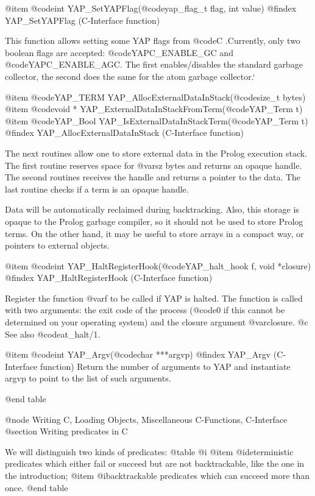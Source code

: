 {{{{{{{{@item  @code{int} YAP_SetYAPFlag(@code{yap_flag_t flag, int value})
@findex YAP_SetYAPFlag (C-Interface function)

This function allows setting some YAP flags from @code{C} .Currently,
only two boolean flags are accepted: @code{YAPC_ENABLE_GC} and
@code{YAPC_ENABLE_AGC}.  The first enables/disables the standard garbage
collector, the second does the same for the atom garbage collector.`

@item  @code{YAP_TERM} YAP_AllocExternalDataInStack(@code{size_t bytes})
@item  @code{void *} YAP_ExternalDataInStackFromTerm(@code{YAP_Term t})
@item  @code{YAP_Bool} YAP_IsExternalDataInStackTerm(@code{YAP_Term t})
@findex YAP_AllocExternalDataInStack (C-Interface function)

The next routines allow one to store external data in the Prolog
execution stack. The first routine reserves space for @var{sz} bytes
and returns an opaque handle. The second routines receives the handle
and returns a pointer to the data.  The last routine checks if a term
is an opaque handle.

Data will be automatically reclaimed during
backtracking. Also, this storage is opaque to the Prolog garbage compiler,
so it should not be used to store Prolog terms. On the other hand, it
may be useful to store arrays in a compact way, or pointers to external objects.

@item  @code{int} YAP_HaltRegisterHook(@code{YAP_halt_hook f, void *closure})
@findex YAP_HaltRegisterHook (C-Interface function)

Register the function @var{f} to be called if YAP is halted. The
function is called with two arguments: the exit code of the process
(@code{0} if this cannot be determined on your operating system) and
the closure argument @var{closure}.
@c See also @code{at_halt/1}.

@item  @code{int} YAP_Argv(@code{char ***argvp})
@findex YAP_Argv (C-Interface function)
Return the number of arguments to YAP and instantiate argvp to point to the list of such arguments.

@end table


@node Writing C, Loading Objects, Miscellaneous C-Functions, C-Interface
@section Writing predicates in C

We will distinguish two kinds of predicates:
@table @i
@item @i{deterministic} predicates which either fail or succeed but are not
backtrackable, like the one in the introduction;
@item @i{backtrackable}
predicates which can succeed more than once.
@end table

}}}}}}}}
